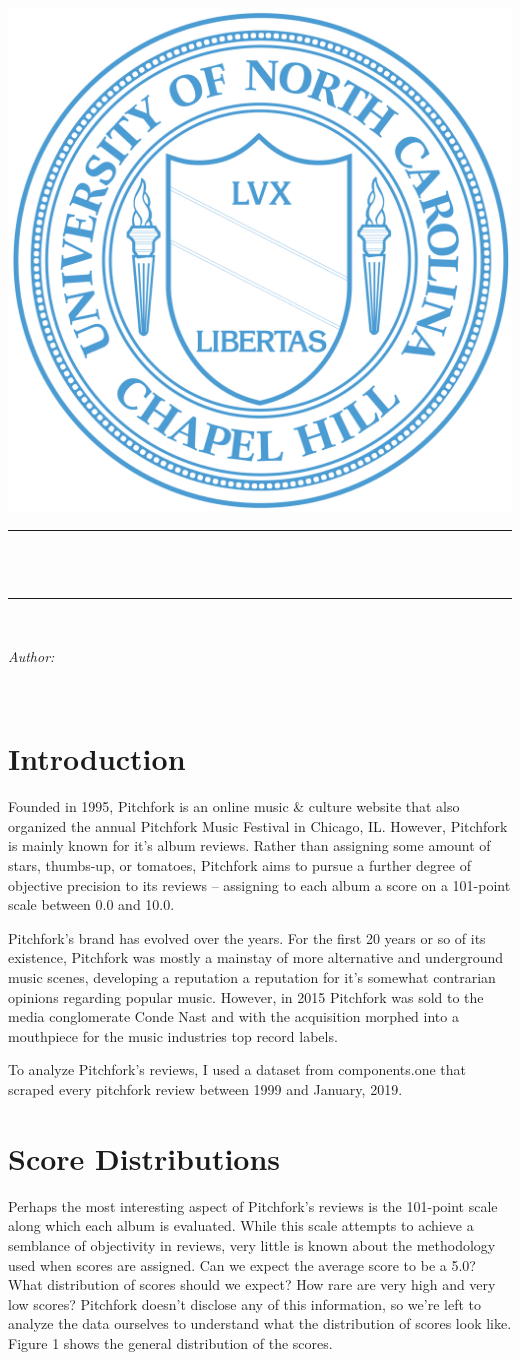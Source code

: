 \documentclass[a4paper,12pt]{article}
\makeatletter
\def\maketitle{
	\begin{center}\leavevmode
		\normalfont
		\vskip 0.5cm   
		\textsc{\large \department}\\
		\vskip 1cm
		\includegraphics[width = 0.4\linewidth]{"unc_seal.png"}
		\vskip 1cm
		\rule{\linewidth}{0.2 mm} \\
		{\large \exam}\\[1 cm]
		{\huge \bfseries \@title \par}
		\vspace{1cm}
		\rule{\linewidth}{0.2 mm} \\[1.5 cm]
		
		\begin{minipage}[t]{0.45\textwidth}
			\begin{flushleft} \large
				\emph{Author:}\\
				\@author
			\end{flushleft}
		\end{minipage}
		\begin{minipage}[t]{0.45\textwidth}
			\begin{flushright} \large
				\ifdefempty{\supervisortwo}{\emph{Instructor:\\}}{\emph{Instructor:\\}}
				\supervisorone\\
				\ifdefempty{\supervisortwo}{}{\supervisortwo\\}
			\end{flushright}
		\end{minipage}
		\vfill
		{\Large \@date\par}
	\end{center}
	\cleardoublepage
}
\makeatother
\begin{document}
	
	
	\maketitle
	
	\tableofcontents

	\newpage
	
	
	
\section{Introduction}
Founded in 1995, Pitchfork is an online music \& culture website that also organized the annual Pitchfork Music Festival in Chicago, IL. However, Pitchfork is mainly known for it's album reviews. Rather than assigning some amount of stars, thumbs-up, or tomatoes, Pitchfork aims to pursue a further degree of objective precision to its reviews -- assigning to each album a score on a 101-point scale between 0.0 and 10.0. 

Pitchfork's brand has evolved over the years. For the first 20 years or so of its existence, Pitchfork was mostly a mainstay of more alternative and underground music scenes, developing a reputation a reputation for it's somewhat contrarian opinions regarding popular music. However, in 2015 Pitchfork was sold to the media conglomerate Conde Nast and with the acquisition morphed into a mouthpiece for the music industries top record labels. 

To analyze Pitchfork's reviews, I used a dataset from components.one that scraped every pitchfork review between 1999 and January, 2019. 



\section{Score Distributions}
Perhaps the most interesting aspect of Pitchfork's reviews is the 101-point scale along which each album is evaluated. While this scale attempts to achieve a semblance of objectivity in reviews, very little is known about the methodology used when scores are assigned. Can we expect the average score to be a 5.0? What distribution of scores should we expect? How rare are very high and very low scores? Pitchfork doesn't disclose any of this information, so we're left to analyze the data ourselves to understand what the distribution of scores look like. Figure 1 shows the general distribution of the scores.
\end{document}
